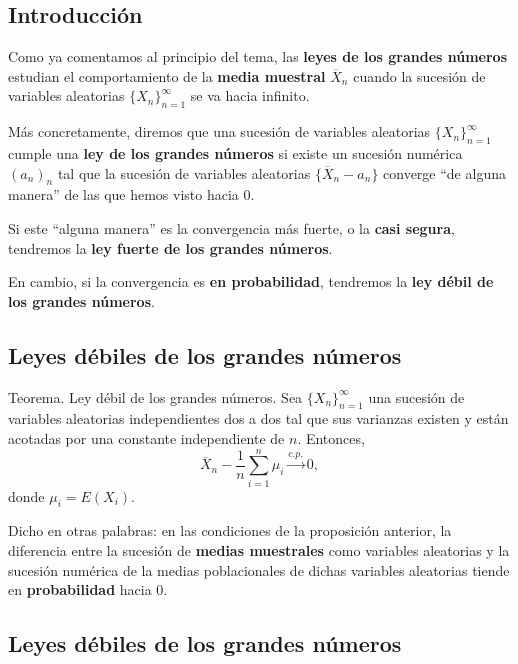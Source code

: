 \documentclass[]{book}
\begin{document}
\hypertarget{introducciuxf3n-15}{%
\subsection{Introducción}\label{introducciuxf3n-15}}

Como ya comentamos al principio del tema, las \textbf{leyes de los grandes números} estudian el comportamiento de la \textbf{media muestral} \(\overline{X}_n\) cuando la sucesión de variables aleatorias \(\{X_n\}_{n=1}^\infty\) se va hacia infinito.

Más concretamente, diremos que una sucesión de variables aleatorias \(\{X_n\}_{n=1}^\infty\) cumple una \textbf{ley de los grandes números} si existe un sucesión numérica \((a_n)_n\) tal que la sucesión de variables aleatorias \(\{\overline{X}_n-a_n\}\) converge ``de alguna manera'' de las que hemos visto hacia 0.

Si este ``alguna manera'' es la convergencia más fuerte, o la \textbf{casi segura}, tendremos la \textbf{ley fuerte de los grandes números}.

En cambio, si la convergencia es \textbf{en probabilidad}, tendremos la \textbf{ley débil de los grandes números}.

\hypertarget{leyes-duxe9biles-de-los-grandes-nuxfameros}{%
\subsection{Leyes débiles de los grandes números}\label{leyes-duxe9biles-de-los-grandes-nuxfameros}}

 Teorema. Ley débil de los grandes números.
Sea \(\{X_n\}_{n=1}^\infty\) una sucesión de variables aleatorias independientes dos a dos tal que sus varianzas existen y están acotadas por una constante independiente de \(n\). Entonces,
\[
\overline{X}_n-\frac{1}{n}\sum_{i=1}^n \mu_i\stackrel{c.p.}{\longrightarrow} 0,
\]
donde \(\mu_i = E(X_i)\).

Dicho en otras palabras: en las condiciones de la proposición anterior, la diferencia entre la sucesión de \textbf{medias muestrales} como variables aleatorias y la sucesión numérica de la medias poblacionales de dichas variables aleatorias tiende en \textbf{probabilidad} hacia 0.

\hypertarget{leyes-duxe9biles-de-los-grandes-nuxfameros-1}{%
\subsection{Leyes débiles de los grandes números}\label{leyes-duxe9biles-de-los-grandes-nuxfameros-1}}
\end{document}
